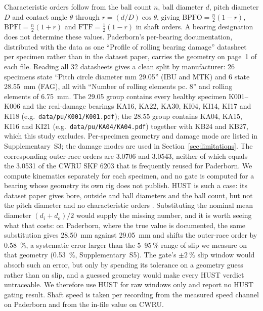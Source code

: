Characteristic orders follow from the ball count $n$, ball diameter $d$, pitch diameter $D$ and contact angle $\theta$
through $r=(d/D)\cos\theta$, giving $\mathrm{BPFO}=\tfrac{n}{2}(1-r)$, $\mathrm{BPFI}=\tfrac{n}{2}(1+r)$ and
$\mathrm{FTF}=\tfrac{1}{2}(1-r)$ in shaft orders. A bearing designation does not determine these values. Paderborn's
per-bearing documentation, distributed with the data as one ``Profile of rolling bearing damage'' datasheet per specimen
rather than in the dataset paper, carries the geometry on page~1 of each file. Reading all 32 datasheets gives a clean
split by manufacturer: 26 specimens state ``Pitch circle diameter mm 29.05'' (IBU and MTK) and 6 state
\SI{28.55}{\milli\metre} (FAG), all with ``Number of rolling elements pc. 8'' and rolling elements of
\SI{6.75}{\milli\metre}. The 29.05 group contains every healthy specimen K001--K006 and the real-damage bearings KA16,
KA22, KA30, KI04, KI14, KI17 and KI18 (e.g.\ \texttt{data/pu/K001/K001.pdf}); the 28.55 group contains KA04, KA15, KI16
and KI21 (e.g.\ \texttt{data/pu/KA04/KA04.pdf}) together with KB24 and KB27, which this study excludes. Per-specimen
geometry and damage mode are listed in Supplementary~S3; the damage modes are used in Section~\ref{sec:limitations}. The corresponding
outer-race orders are 3.0706 and 3.0543, neither of which equals the 3.0531 of the CWRU SKF 6203 that is frequently reused
for Paderborn. We compute kinematics separately for each specimen, and no gate is computed for a bearing whose geometry its own rig does
not publish. HUST is such a case: its dataset paper gives bore, outside and ball diameters and the ball count, but not the
pitch diameter and no characteristic orders \cite{thuan2023hust}. Substituting the nominal mean diameter $(d_i+d_o)/2$
would supply the missing number, and it is worth seeing what that costs: on Paderborn, where the true value is documented,
the same substitution gives \SI{28.50}{\milli\metre} against \SI{29.05}{\milli\metre} and shifts the outer-race order by
\SI{0.58}{\percent}, a systematic error larger than the 5--95\,\% range of slip we measure on that geometry
(\SI{0.53}{\percent}, Supplementary~S5). The gate's $\pm\SI{2}{\percent}$ slip window would absorb such an error, but only by
spending its tolerance on a geometry guess rather than on slip, and a guessed geometry would make every HUST verdict
untraceable. We therefore use HUST for raw windows only and report no HUST gating result. Shaft speed is taken per
recording from the measured speed channel on Paderborn and from the in-file value on CWRU.

